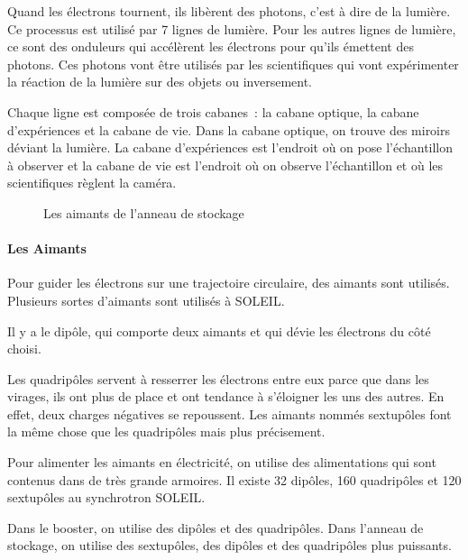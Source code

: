 				Quand les électrons tournent, ils libèrent des photons, c'est à dire de la lumière. Ce processus est utilisé par 7 lignes de lumière. Pour les autres lignes de lumière, ce sont des onduleurs qui accélèrent les électrons pour qu'ils émettent des photons. Ces photons vont être utilisés par les scientifiques qui vont expérimenter la réaction de la lumière sur des objets ou inversement. 
				\par Chaque ligne est composée de trois cabanes\ : la cabane optique, la cabane d'expériences et la cabane de vie. 
				Dans la cabane optique, on trouve des miroirs déviant la lumière. La cabane d'expériences est l'endroit où on pose l'échantillon à observer et la cabane de vie est l'endroit où on observe l'échantillon et où les scientifiques règlent la caméra. 
			\begin{figure}
 				 \centering
 				 \caption{Les aimants de l'anneau de stockage}
				\end{figure}

			\paragraph{Les Aimants}
				Pour guider les électrons sur une trajectoire circulaire, des aimants sont utilisés. Plusieurs sortes d'aimants sont utilisés à SOLEIL.\par Il y a le dipôle, qui comporte deux aimants et qui dévie les électrons du côté choisi. 
				\par Les quadripôles servent à resserrer les électrons entre eux parce que dans les virages, ils ont plus de place et ont tendance à s'éloigner les uns des autres. En effet, deux charges négatives se repoussent. Les aimants nommés sextupôles font la même chose que les quadripôles mais plus précisement. 
				\par Pour alimenter les aimants en électricité, on utilise des alimentations qui sont contenus dans de très grande armoires. Il existe 32 dipôles, 160 quadripôles et 120 sextupôles au synchrotron SOLEIL. 
				\par Dans le booster, on utilise des dipôles et des quadripôles. Dans l'anneau de stockage, on utilise des sextupôles, des dipôles et des quadripôles plus puissants. 
			
